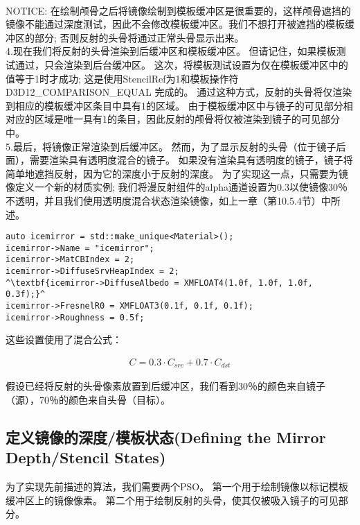 \begin{flushleft}
~\\
NOTICE: 在绘制颅骨之后将镜像绘制到模板缓冲区是很重要的，这样颅骨遮挡的镜像不能通过深度测试，因此不会修改模板缓冲区。我们不想打开被遮挡的模板缓冲区的部分; 否则反射的头骨将通过正常头骨显示出来。
~\\
4.现在我们将反射的头骨渲染到后缓冲区和模板缓冲区。 但请记住，如果模板测试通过，只会渲染到后台缓冲区。 这次，将模板测试设置为仅在模板缓冲区中的值等于1时才成功; 这是使用StencilRef为1和模板操作符 D3D12\_COMPARISON\_EQUAL 完成的。 通过这种方式，反射的头骨将仅渲染到相应的模板缓冲区条目中具有1的区域。 由于模板缓冲区中与镜子的可见部分相对应的区域是唯一具有1的条目，因此反射的颅骨将仅被渲染到镜子的可见部分中。\\

5.最后，将镜像正常渲染到后缓冲区。 然而，为了显示反射的头骨（位于镜子后面），需要渲染具有透明度混合的镜子。 如果没有渲染具有透明度的镜子，镜子将简单地遮挡反射，因为它的深度小于反射的深度。 为了实现这一点，只需要为镜像定义一个新的材质实例; 我们将漫反射组件的alpha通道设置为0.3以使镜像30％不透明，并且我们使用透明度混合状态渲染镜像，如上一章（第10.5.4节）中所述。\\
\end{flushleft}

\begin{lstlisting}[escapechar=^]
auto icemirror = std::make_unique<Material>();
icemirror->Name = "icemirror";
icemirror->MatCBIndex = 2;
icemirror->DiffuseSrvHeapIndex = 2;
^\textbf{icemirror->DiffuseAlbedo = XMFLOAT4(1.0f, 1.0f, 1.0f, 0.3f);}^
icemirror->FresnelR0 = XMFLOAT3(0.1f, 0.1f, 0.1f);
icemirror->Roughness = 0.5f;
\end{lstlisting}

\begin{flushleft}
这些设置使用了混合公式：\\
\end{flushleft}

\begin{align*}
C=0.3\cdot C_{src}+0.7\cdot C_{dst}
\end{align*}

\begin{flushleft}
假设已经将反射的头骨像素放置到后缓冲区，我们看到30％的颜色来自镜子（源），70％的颜色来自头骨（目标）。
\end{flushleft}

\subsection{定义镜像的深度/模板状态(Defining the Mirror Depth/Stencil States)}
\begin{flushleft}
为了实现先前描述的算法，我们需要两个PSO。 第一个用于绘制镜像以标记模板缓冲区上的镜像像素。 第二个用于绘制反射的头骨，使其仅被吸入镜子的可见部分。\\
\end{flushleft}

